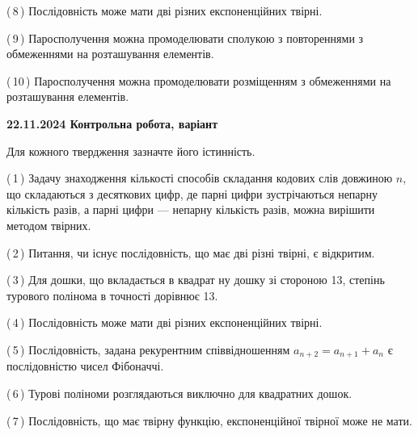 \documentclass[12pt, ukrainian]{article}
\begin{document}
\begin {large}
\begin {large}
\begin {large}
\begin {large}
\begin {large}
\begin {large}
\begin {large}
\begin {large}
\begin {large}
\begin {large}
\begin {large}
\begin {large}
\begin {large}
\begin {large}
\begin {large}
\begin {large}
\begin {large}
\begin {large}
\begin {large}
\begin {large}
\begin {large}
\begin {large}
\begin {large}
\begin {large}
\begin {large}
\begin {large}
\begin {large}
\begin {large}
\begin {large}
\begin {large}
\begin {large}
{(\,8\,) Послідовність може мати дві різних експоненційних твірні.%



(\,9\,) Паросполучення можна промоделювати сполукою з повтореннями з обмеженнями на розташування елементів.%



(\,10\,) Паросполучення можна промоделювати розміщенням з обмеженнями на розташування елементів.%




\vspace{5mm}
}
\newpage

\begin {large}

\textbf{22.11.2024 Контрольна робота, варіант  }\par


{
Для кожного твердження зазначте його істинність.\par

\vspace{2mm}

(\,1\,) Задачу знаходження кількості способів складання кодових слів довжиною $n$, що складаються з десяткових цифр, де парні цифри зустрічаються непарну кількість разів, а парні цифри — непарну кількість разів, можна вирішити методом твірних.%



(\,2\,) Питання, чи існує послідовність, що має дві різні твірні, є відкритим.%



(\,3\,) Для дошки, що вкладається в квадрат ну дошку зі стороною 13, степінь турового полінома в точності дорівнює 13.%



(\,4\,) Послідовність може мати дві різних експоненційних твірні.%



(\,5\,) Послідовність, задана рекурентним співвідношенням $a_{n+2}=a_{n+1}+a_{n}$ є послідовністю чисел Фібоначчі.%



(\,6\,) Турові поліноми розглядаються виключно для квадратних дошок.%



(\,7\,) Послідовність, що має твірну функцію, експоненційної твірної може не мати.%



}
\end{large}
\end{large}
\end{large}
\end{large}
\end{large}
\end{large}
\end{large}
\end{large}
\end{large}
\end{large}
\end{large}
\end{large}
\end{large}
\end{large}
\end{large}
\end{large}
\end{large}
\end{large}
\end{large}
\end{large}
\end{large}
\end{large}
\end{large}
\end{large}
\end{large}
\end{large}
\end{large}
\end{large}
\end{large}
\end{large}
\end{large}
\end{large}
\end{document}
